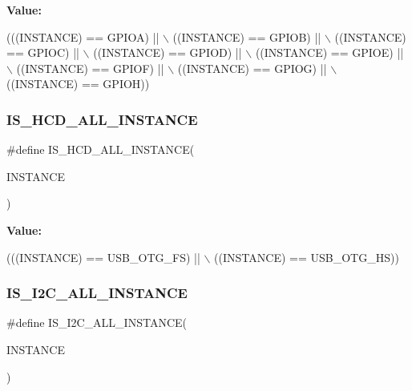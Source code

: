 {\bfseries Value\+:}
\begin{DoxyCode}
(((INSTANCE) == GPIOA) || \(\backslash\)
                                        ((INSTANCE) == GPIOB) || \(\backslash\)
                                        ((INSTANCE) == GPIOC) || \(\backslash\)
                                        ((INSTANCE) == GPIOD) || \(\backslash\)
                                        ((INSTANCE) == GPIOE) || \(\backslash\)
                                        ((INSTANCE) == GPIOF) || \(\backslash\)
                                        ((INSTANCE) == GPIOG) || \(\backslash\)
                                        ((INSTANCE) == GPIOH))
\end{DoxyCode}
\mbox{\label{group___exported__macros_ga6696ebd1aea007a19e831517f3e1f497}} 
\subsubsection{\texorpdfstring{I\+S\+\_\+\+H\+C\+D\+\_\+\+A\+L\+L\+\_\+\+I\+N\+S\+T\+A\+N\+CE}{IS\_HCD\_ALL\_INSTANCE}}
{\footnotesize\ttfamily \#define I\+S\+\_\+\+H\+C\+D\+\_\+\+A\+L\+L\+\_\+\+I\+N\+S\+T\+A\+N\+CE(\begin{DoxyParamCaption}\item[{}]{I\+N\+S\+T\+A\+N\+CE }\end{DoxyParamCaption})}

{\bfseries Value\+:}
\begin{DoxyCode}
(((INSTANCE) == USB\_OTG\_FS) || \(\backslash\)
                                       ((INSTANCE) == USB\_OTG\_HS))
\end{DoxyCode}
\mbox{\label{group___exported__macros_gacdf0149a4e8c41a6814c13613c38a6b2}} 
\subsubsection{\texorpdfstring{I\+S\+\_\+\+I2\+C\+\_\+\+A\+L\+L\+\_\+\+I\+N\+S\+T\+A\+N\+CE}{IS\_I2C\_ALL\_INSTANCE}}
{\footnotesize\ttfamily \#define I\+S\+\_\+\+I2\+C\+\_\+\+A\+L\+L\+\_\+\+I\+N\+S\+T\+A\+N\+CE(\begin{DoxyParamCaption}\item[{}]{I\+N\+S\+T\+A\+N\+CE }\end{DoxyParamCaption})}

